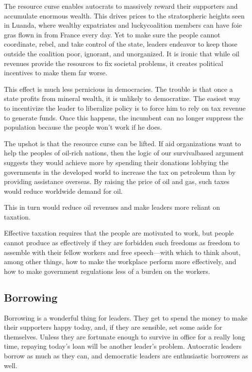 \documentclass[10pt]{article}
\begin{document}
{\large The resource curse enables autocrats to massively reward their
supporters and accumulate enormous wealth. This drives prices to the
stratospheric heights seen in Luanda, where wealthy expatriates and
luckycoalition members can have foie gras flown in from France every day. Yet to
make sure the people cannot coordinate, rebel, and take control of the state,
leaders endeavor to keep those outside the coalition poor, ignorant, and
unorganized. It is ironic that while oil revenues provide the resources to fix
societal problems, it creates political incentives to make them far worse.}

{\large This effect is much less pernicious in democracies. The trouble is that
once a state profits from mineral wealth, it is unlikely to democratize. The
easiest way to incentivize the leader to liberalize policy is to force him to
rely on tax revenue to generate funds. Once this happens, the incumbent can no
longer suppress the population because the people won't work if he does.}

{\large The upshot is that the resource curse can be lifted. If aid
organizations want to help the peoples of oil-rich nations, then the logic of our
survivalbased argument suggests they would achieve more by spending their
donations lobbying the governments in the developed world to increase the tax on
petroleum than by providing assistance overseas. By raising the price of oil and
gas, such taxes would reduce worldwide demand for oil.}

{\large This in turn would reduce oil revenues and make leaders more reliant on
taxation.}

{\large Effective taxation requires that the people are motivated to work, but
people cannot produce as effectively if they are forbidden such freedoms as
freedom to assemble with their fellow workers and free speech---with which to
think about, among other things, how to make the workplace perform more
effectively, and how to make government regulations less of a burden on the
workers.}

\subsection{Borrowing}

{\large Borrowing is a wonderful thing for leaders. They get to spend the money
to make their supporters happy today, and, if they are sensible, set some aside
for themselves. Unless they are fortunate enough to survive in office for a
really long time, repaying today's loan will be another leader's problem.
Autocratic leaders borrow as much as they can, and democratic leaders are
enthusiastic borrowers as well.}
\end{document}
